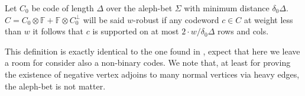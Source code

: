 \documentclass[manuscript,screen,review]{acmart}
\begin{document}
%
%
%
%
%
%
%
%
%
%
%
%

\begin{definition}[$w$-Robustness] Let $C_{0}$ be code of length $\Delta$ over the aleph-bet $\Sigma$ with minimum distance $\delta_{0}\Delta$. $C = C_{0} \otimes \mathbb{F} + \mathbb{F}\otimes C_{0}^{\perp}$ will be said $w$-robust if any codeword $c \in C$ at weight less than $w$ it follows that $c$ is supported on at most $2\cdot w/\delta_{0}\Delta$ rows and cols.
\end{definition}

This definition is exactly identical to the one found in \cite{leverrier2022quantum}, expect that here we leave a room for consider also a non-binary codes. We note that, at least for proving the existence of negative vertex adjoins to many normal vertices via heavy edges, the aleph-bet is not matter.  

\printbibliography 
\end{document}
